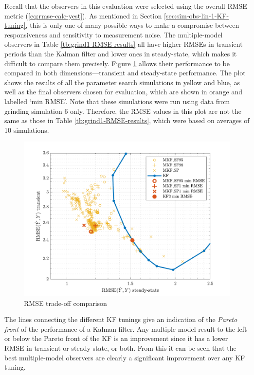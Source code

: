 Recall that the observers in this evaluation were selected using the overall \gls{RMSE} metric (\ref{eq:rmse-calc-yest}). As mentioned in Section \ref{sec:sim-obs-lin-1-KF-tuning}, this is only one of many possible ways to make a compromise between responsiveness and sensitivity to measurement noise. The multiple-model observers in Table \ref{tb:grind1-RMSE-results} all have higher \gls{RMSE}s in transient periods than the Kalman filter and lower ones in steady-state, which makes it difficult to compare them precisely. Figure \ref{fig:grind1-RMSE-scatter} allows their performance to be compared in both dimensions---transient and steady-state performance. The plot shows the results of all the parameter search simulations in yellow and blue, as well as the final observers chosen for evaluation, which are shown in orange and labelled `min RMSE'. Note that these simulations were run using data from grinding simulation 6 only. Therefore, the \gls{RMSE} values in this plot are not the same as those in Table \ref{tb:grind1-RMSE-results}, which were based on averages of 10 simulations.
\begin{figure}[htp]
	\centering
	\includegraphics[width=13cm]{images/grind1_rod_obs_sim_popt_RMSE_scatter.pdf}
	\caption{RMSE trade-off comparison}
	\label{fig:grind1-RMSE-scatter}
\end{figure}
The lines connecting the different \gls{KF} tunings give an indication of the \textit{Pareto front} of the performance of a Kalman filter. Any multiple-model result to the left or below the Pareto front of the \gls{KF} is an improvement since it has a lower \gls{RMSE} in transient or steady-state, or both. From this it can be seen that the best multiple-model observers are clearly a significant improvement over any \gls{KF} tuning.

